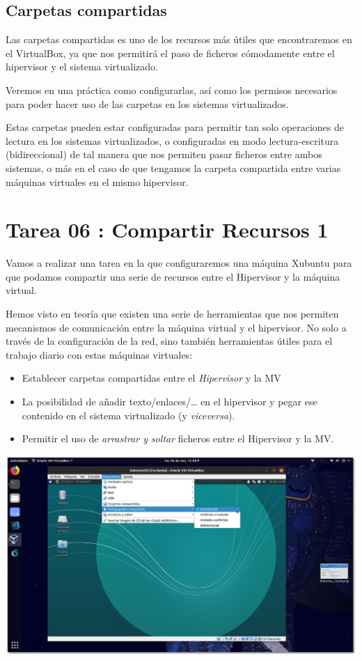 \documentclass[11pt]{article}
\begin{document}
\subsection{Carpetas compartidas}
\label{sec:org879d7c2}
Las carpetas compartidas es uno de los recursos más útiles que
encontraremos en el VirtualBox, ya que nos permitirá el paso de ficheros
cómodamente entre el hipervisor y el sistema virtualizado.

Veremos en una práctica como configurarlas, así como los permisos
necesarios para poder hacer uso de las carpetas en los sistemas
virtualizados.

Estas carpetas pueden estar configuradas para permitir tan solo
operaciones de lectura en los sistemas virtualizados, o configuradas en
modo lectura-escritura (bidireccional) de tal manera que nos permiten
pasar ficheros entre ambos sistemas, o más en el caso de que tengamos la
carpeta compartida entre varias máquinas virtuales en el mismo
hipervisor.


\newpage


\section{Tarea 06 : Compartir Recursos 1}
\label{sec:org1c79179}
Vamos a realizar una tarea en la que configuraremos una máquina Xubuntu
para que podamos compartir una serie de recursos entre el Hipervisor y
la máquina virtual.

Hemos visto en teoría que existen una serie de herramientas que nos
permiten mecanismos de comunicación entre la máquina virtual y el
hipervisor. No solo a través de la configuración de la red, sino también
herramientas útiles para el trabajo diario con estas máquinas virtuales:

\begin{itemize}
\item Establecer carpetas compartidas entre el \emph{Hipervisor} y la MV
\item La posibilidad de añadir texto/enlaces/\ldots{} en el hipervisor y pegar
ese contenido en el sistema virtualizado (y \emph{viceversa}).
\item Permitir el uso de \emph{arrastrar y soltar} ficheros entre el Hipervisor y
la MV.
\end{itemize}

\begin{center}
\includegraphics[width=.9\linewidth]{imgs/VBox_GuestAdd_LinuX_007.png}
\end{center}
\end{document}
